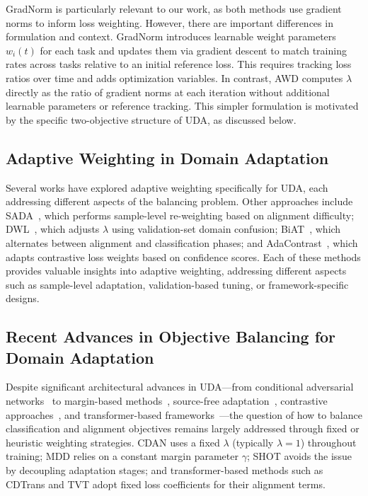 \documentclass[pdflatex,sn-mathphys-num]{sn-jnl}
\theoremstyle{thmstyleone}
\theoremstyle{thmstyletwo}
\theoremstyle{thmstylethree}
\begin{document}
GradNorm is particularly relevant to our work, as both methods use gradient norms to inform loss weighting. However, there are important differences in formulation and context. GradNorm introduces learnable weight parameters $w_i(t)$ for each task and updates them via gradient descent to match training rates across tasks relative to an initial reference loss. This requires tracking loss ratios over time and adds optimization variables. In contrast, AWD computes $\lambda$ directly as the ratio of gradient norms at each iteration without additional learnable parameters or reference tracking. This simpler formulation is motivated by the specific two-objective structure of UDA, as discussed below.

\subsection{Adaptive Weighting in Domain Adaptation}

Several works have explored adaptive weighting specifically for UDA, each addressing different aspects of the balancing problem. Other approaches include SADA~\cite{wang2020sada}, which performs sample-level re-weighting based on alignment difficulty; DWL~\cite{xiao2021dwl}, which adjusts $\lambda$ using validation-set domain confusion; BiAT~\cite{liang2022biat}, which alternates between alignment and classification phases; and AdaContrast~\cite{chen2022contrastive}, which adapts contrastive loss weights based on confidence scores. Each of these methods provides valuable insights into adaptive weighting, addressing different aspects such as sample-level adaptation, validation-based tuning, or framework-specific designs.

\subsection{Recent Advances in Objective Balancing for Domain Adaptation}

Despite significant architectural advances in UDA---from conditional adversarial networks~\cite{long2018cdan} to margin-based methods~\cite{zhang2019mdd}, source-free adaptation~\cite{liang2020shot}, contrastive approaches~\cite{chen2022contrastive}, and transformer-based frameworks~\cite{xu2022cdtrans,yang2023tvt}---the question of how to balance classification and alignment objectives remains largely addressed through fixed or heuristic weighting strategies. CDAN uses a fixed $\lambda$ (typically $\lambda = 1$) throughout training; MDD relies on a constant margin parameter $\gamma$; SHOT avoids the issue by decoupling adaptation stages; and transformer-based methods such as CDTrans and TVT adopt fixed loss coefficients for their alignment terms.
\end{document}
